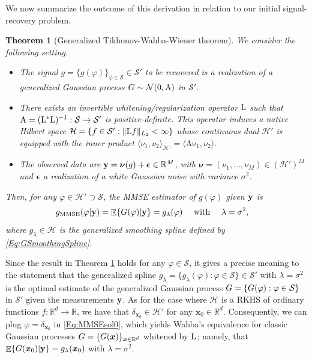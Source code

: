 \documentclass[11pt, english,english]{article}
\newtheorem{theorem}{Theorem}
\newcommand{\inR}{\in \mathbb{R}}
\newcommand{\R}{ \mathbb{R}}
\newcommand{\Lop}{{\rm L}}
\def\V#1{{\boldsymbol{#1}}}         %
\def\Spc#1{{\mathcal{#1}}}  %
\def\M#1{{\bf{#1}}}  %
\def\Op#1{{\mathrm{#1}}}  %
\def\Exp{\mathop{\mathbb{E}}\nolimits}
\renewcommand{\[}{\begin{equation}}
\renewcommand{\]}[1]{\label{eq:#1}\end{equation}}
\def\Exp{\mathop{\mathbb{E}}\nolimits}
\def\gRand#1{{\uppercase{ #1}}}         %
\newcommand{\Tr}{\mathsf{T}}
\begin{document}
We now summarize the outcome of this derivation in relation to our initial signal-recovery problem.
\begin{theorem}[Generalized Tikhonov-Wahba-Wiener theorem] 
\label{Theo:GenGaussMarkov}
We consider the following setting.
\begin{itemize}
\item The signal $g=\{g(\varphi)\}_{\varphi \in \Spc S} \in \Spc S'$ to be recovered  is a realization of a generalized Gaussian process $\gRand g\sim \Spc N(0,\Op A) $ in $\Spc S'$.
\item There exists an invertible whitening/regularization operator $\Lop$ such that $\Op A=(\Lop^\ast \Lop)^{-1}: \Spc S \to \Spc S'$ is positive-definite. This operator induces a native Hilbert space $\Spc H=\{f\in \Spc S': \|\Lop f\|_{L_2}<\infty\}$ whose continuous dual $\Spc H'$ is equipped with the inner product $\langle \nu_1,\nu_2\rangle_{\Spc H'}=\langle \Op A\Op \nu_1,\nu_2\rangle$.
\item The observed data are $\M y=\V \nu(g) + \V \epsilon \in \R^M$,
with $\V \nu=(\nu_1, \dots,\nu_M)\in (\Spc H')^M$ and $\V \epsilon$ a realization of a white Gaussian noise  with variance $\sigma^2$.
\end{itemize}
Then, for any $\varphi\in \Spc H'\supset \Spc S$, the MMSE estimator of
$g(\varphi)$ given $\M y$ %
is 
\begin{align}
\label{Eq:MMSEsol0}
g_{{\rm MMSE}}(\varphi|\M y)=\Exp\{\gRand g( \varphi)|\M y\}%
&=g_{\lambda}( \varphi)\quad \mbox{ with }\quad  \lambda=\sigma^2,
\end{align}
where %
$g_{\lambda}\in \Spc H$ is the generalized smoothing spline defined by \eqref{Eq:GSmoothingSpline}.

\end{theorem}

Since the result in Theorem \ref{Theo:GenGaussMarkov} holds for any $\varphi\in  \Spc S$, it gives a precise meaning to the statement that the generalized spline $g_\lambda=\{g_\lambda(\varphi): \varphi \in \Spc S\} \in  \Spc S'$ with $\lambda=\sigma^2$ is the optimal estimate of the generalized Gaussian process
$\gRand G=\{\gRand g(\varphi): \varphi \in \Spc S\}$ in $\Spc S'$ given the measurements $\M y$. As for the case where $\Spc H$ is a RKHS of ordinary functions $f: \R^d \to \R$, we have that $\delta_{\V x_0} \in \Spc H'$ for any 
$\V x_0 \in \R^d$. Consequently, we can plug $\varphi=\delta_{\V x_0}$ in \eqref{Eq:MMSEsol0}, which yields Wahba's equivalence for classic  Gaussian processes $\gRand G=\{\gRand g(\V x)\}_{\V x \in \R^d}$ whitened by $\Lop$; namely, that $\Exp\{\gRand g(\V x_0)|\M y\}=g_{\lambda}(\V x_0)$
with $\lambda=\sigma^2$.
\end{document}
